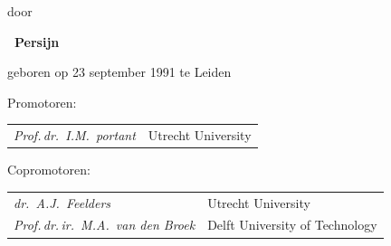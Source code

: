 \begin{titlepage}
\begin{center}
        door

        \bigskip
        \bigskip



        {\makeatletter
        \Large\titlefont\bfseries\@firstname~Persijn~{\titleshape\@lastname}
        \makeatother}



        \bigskip
        \bigskip



        geboren op 23 september 1991 te Leiden


        \vspace*{2\bigskipamount}

\end{center}







\clearpage

\thispagestyle{empty}



Promotoren: \\[\medskipamount] 
\begin{tabular}{@{}p{}@{}p{}}     
        \textit{Prof.\,dr.\ I.M.~portant} &  Utrecht University \\[\medskipamount]     
\end{tabular}

Copromotoren: \\[\medskipamount] 
\begin{tabular}{@{}p{}@{}p{}} 
        \textit{dr.\ A.J.~Feelders} &  Utrecht University \\[\medskipamount]
        \textit{Prof.\,dr.\,ir.\ M.A.~van den Broek} &  Delft University of Technology \\[\medskipamount]         
\end{tabular}


\end{titlepage}
